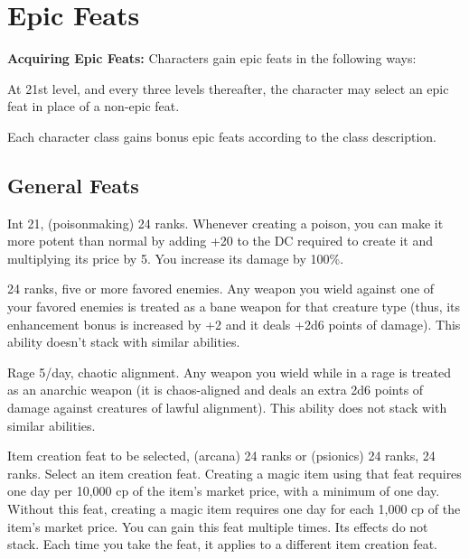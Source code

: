 \clearpage
\section{Epic Feats}
\textbf{Acquiring Epic Feats:} Characters gain epic feats in the following ways:
\begin{itemize*}
\item At 21st level, and every three levels thereafter, the character may select an epic feat in place of a non-epic feat.
\item Each character class gains bonus epic feats according to the class description.
\end{itemize*}





\subsection{General Feats}
{Int 21,  (poisonmaking) 24 ranks.}
{Whenever creating a poison, you can make it more potent than normal by adding +20 to the DC required to create it and multiplying its price by 5. You increase its damage by 100\%.}

{ 24 ranks, five or more favored enemies.}
{Any weapon you wield against one of your favored enemies is treated as a bane weapon for that creature type (thus, its enhancement bonus is increased by +2 and it deals +2d6 points of damage). This ability doesn't stack with similar abilities.}

{Rage 5/day, chaotic alignment.}
{Any weapon you wield while in a rage is treated as an anarchic weapon (it is chaos-aligned and deals an extra 2d6 points of damage against creatures of lawful alignment). This ability does not stack with similar abilities.}

{}
{Item creation feat to be selected,  (arcana) 24 ranks or  (psionics) 24 ranks,  24 ranks.}
{Select an item creation feat. Creating a magic item using that feat requires one day per 10,000 cp of the item's market price, with a minimum of one day.}
{Without this feat, creating a magic item requires one day for each 1,000 cp of the item's market price.}
{You can gain this feat multiple times. Its effects do not stack. Each time you take the feat, it applies to a different item creation feat.}

